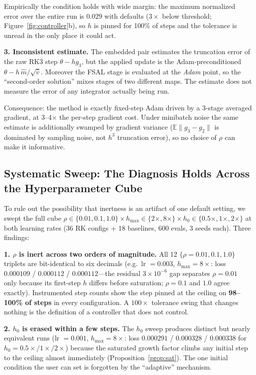 \documentclass{article}
\newcommand{\hmax}{h_{\max}}
\begin{document}
Empirically the condition holds with wide margin: the maximum normalized error over the entire run is $0.029$ with defaults ($3\times$ below threshold; Figure~\ref{fig:controller}b), so $h$ is pinned for 100\% of steps and the tolerance is unread in the only place it could act.

\textbf{3. Inconsistent estimate.} The embedded pair estimates the truncation error of the raw RK3 step $\theta - h g_3$, but the applied update is the Adam-preconditioned $\theta - h\, \hat m/\sqrt{\hat v}$. Moreover the FSAL stage is evaluated at the \emph{Adam} point, so the ``second-order solution'' mixes stages of two different maps. The estimate does not measure the error of any integrator actually being run.

Consequence: the method is exactly fixed-step Adam driven by a 3-stage averaged gradient, at 3--4$\times$ the per-step gradient cost. Under minibatch noise the same estimate is additionally swamped by gradient variance ($\mathbb{E}\|g_3 - g_2\|$ is dominated by sampling noise, not $h^3$ truncation error), so no choice of $\rho$ can make it informative.

\subsection{Systematic Sweep: The Diagnosis Holds Across the Hyperparameter Cube}
\label{sec:sweep}

To rule out the possibility that inertness is an artifact of one default setting, we swept the full cube $\rho \in \{0.01, 0.1, 1.0\} \times \hmax \in \{2\times, 8\times\} \times h_0 \in \{0.5\times, 1\times, 2\times\}$ at both learning rates (36 RK configs + 18 baselines, 600 evals, 3 seeds each). Three findings:

\textbf{1. $\rho$ is inert across two orders of magnitude.} All 12 $\{\rho = 0.01, 0.1, 1.0\}$ triplets are bit-identical to six decimals (e.g.\ lr $=0.003$, $\hmax{=}8\times$: loss $0.000109$ / $0.000112$ / $0.000112$---the residual $3{\times}10^{-6}$ gap separates $\rho{=}0.01$ only because its first-step $h$ differs before saturation; $\rho{=}0.1$ and $1.0$ agree exactly). Instrumented step counts show the step pinned at the ceiling on \textbf{98--100\% of steps} in every configuration. A $100\times$ tolerance swing that changes nothing is the definition of a controller that does not control.

\textbf{2. $h_0$ is erased within a few steps.} The $h_0$ sweep produces distinct but nearly equivalent runs (lr $=0.001$, $\hmax{=}8\times$: loss $0.000291$ / $0.000328$ / $0.000338$ for $h_0 = 0.5{\times}/1{\times}/2{\times}$) because the saturated growth factor climbs any initial step to the ceiling almost immediately (Proposition~\ref{prop:sat}). The one initial condition the user can set is forgotten by the ``adaptive'' mechanism.
\end{document}
